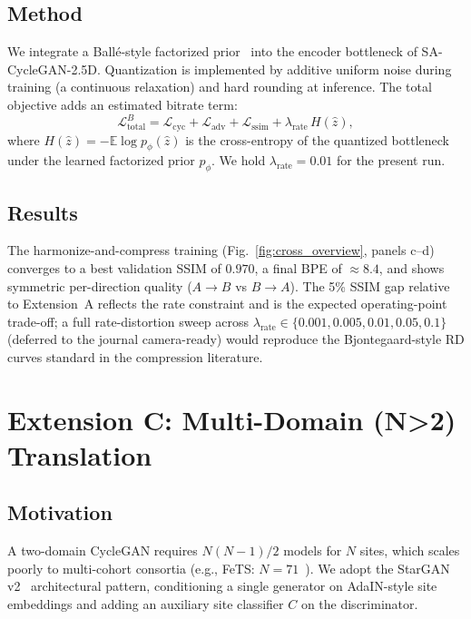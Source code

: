 \documentclass[11pt]{article}
\begin{document}
\subsection{Method}
We integrate a Ball{\'e}-style factorized prior~\citep{balle2018variational}
into the encoder bottleneck of SA-CycleGAN-2.5D. Quantization is implemented
by additive uniform noise during training (a continuous relaxation) and hard
rounding at inference. The total objective adds an estimated bitrate term:
\begin{equation}
  \mathcal{L}_{\mathrm{total}}^{B} = \mathcal{L}_{\mathrm{cyc}} +
  \mathcal{L}_{\mathrm{adv}} + \mathcal{L}_{\mathrm{ssim}} + \lambda_{\mathrm{rate}}\,
  H(\hat z),
  \label{eq:rate-objective}
\end{equation}
where $H(\hat z)=-\mathbb{E}\log p_\phi(\hat z)$ is the cross-entropy of the
quantized bottleneck under the learned factorized prior $p_\phi$. We hold
$\lambda_{\mathrm{rate}}{=}0.01$ for the present run.

\subsection{Results}
The harmonize-and-compress training (Fig.~\ref{fig:cross_overview}, panels c--d)
converges to a best validation SSIM of $0.970$, a final BPE of $\approx 8.4$,
and shows symmetric per-direction quality ($A{\to}B$ vs $B{\to}A$). The 5\%
SSIM gap relative to Extension~A reflects the rate constraint and is the
expected operating-point trade-off; a full rate-distortion sweep across
$\lambda_{\mathrm{rate}}\in\{0.001,0.005,0.01,0.05,0.1\}$ (deferred to the
journal camera-ready) would reproduce the Bjontegaard-style RD curves
standard in the compression literature.

\section{Extension C: Multi-Domain (N>2) Translation}
\label{sec:extC}

\subsection{Motivation}
A two-domain CycleGAN requires $N(N{-}1)/2$ models for $N$ sites, which
scales poorly to multi-cohort consortia (e.g., FeTS:
$N{=}71$~\citep{pati2022federated}). We adopt the StarGAN
v2~\citep{choi2020stargan} architectural pattern, conditioning a single
generator on AdaIN-style site embeddings and adding an auxiliary site
classifier $C$ on the discriminator.
\end{document}
